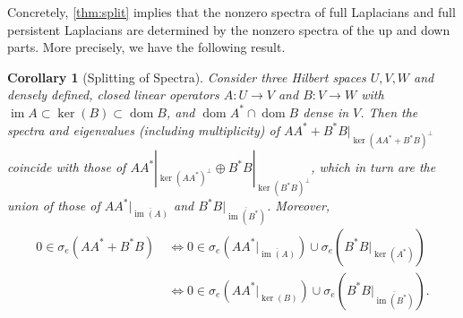 \documentclass[11pt]{article}
\newtheorem{cor}[theorem]{Corollary}
\theoremstyle{definition}
\theoremstyle{remark}
\DeclareMathOperator\dom{dom}
\DeclareMathOperator{\im}{im}
\begin{document}
Concretely, \cref{thm:split} implies that the nonzero spectra of full Laplacians and full persistent Laplacians are determined by the nonzero spectra of the up and down parts. More precisely, we have the following result.

\begin{cor}[Splitting of Spectra]\label{cor:split}
    Consider three Hilbert spaces $U,V,W$ and densely defined, closed linear operators $A:U \rightarrow V$ and $B: V \rightarrow W$ with $\im A\subset \ker(B) \subset \dom B$, and $\dom A^*\cap \dom B$ dense in $V$. Then the spectra and eigenvalues (including multiplicity) of $AA^*+B^*B|_{\ker(AA^*+B^*B)^\perp}$ coincide with those of $AA^*|_{\ker(AA^*)^\perp}\oplus B^*B|_{\ker(B^*B)^\perp}$, which in turn are the union of those of $AA^*|_{\overline{\im(A)}}$ and $B^*B|_{\overline{\im(B^*)}}$. Moreover,
    \begin{align}
        0 \in \sigma_e(AA^*+B^*B) \ &\Leftrightarrow 0 \in \sigma_e(AA^*|_{\overline{\im(A)}}) \cup \sigma_e (B^*B|_{\ker(A^*)}) \label{eq:splitse2}\\
        &\Leftrightarrow 0 \in \sigma_e(AA^*|_{\ker(B)}) \cup \sigma_e (B^*B|_{\overline{\im(B^*)}}). \label{eq:splitse1}
    \end{align}
\end{cor}
\end{document}
